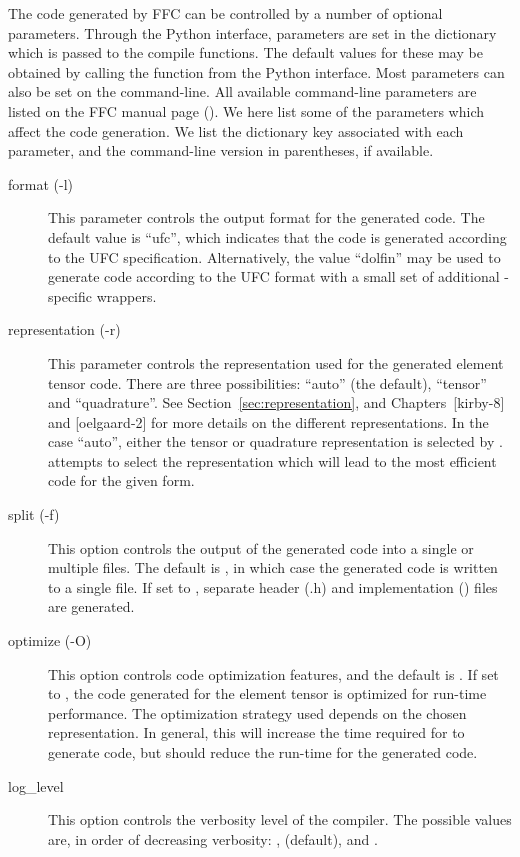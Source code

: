 The code generated by FFC can be controlled by a number of optional
parameters. Through the Python interface, parameters are set in the
dictionary  which is passed to the compile functions.
The default values for these may be obtained by calling the
function  from the Python interface. Most
parameters can also be set on the command-line.  All available
command-line parameters are listed on the FFC manual page (). We here list some of the parameters which affect the code
generation. We list the dictionary key associated with each parameter,
and the command-line version in parentheses, if available.
%
\begin{description}
  \item[format (-l)] This parameter controls the output format for the
    generated code. The default value is ``ufc'', which indicates that
    the code is generated according to the UFC
    specification. Alternatively, the value ``dolfin'' may be used to
    generate code according to the UFC format with a small set of
    additional \dolfin{}-specific wrappers.
  \item[representation (-r)] This parameter controls the
    representation used for the generated element tensor code. There
    are three possibilities: ``auto'' (the default), ``tensor'' and
    ``quadrature''. See Section~\ref{sec:representation}, and
    Chapters~[kirby-8] and [oelgaard-2] for more details on the
    different representations. In the case ``auto'', either the tensor or
    quadrature representation is selected by \ffc{}. \ffc{}
    attempts to select the representation which will lead to the
    most efficient code for the given form.
  \item[split (-f)] This option controls the output of the
    generated code into a single or multiple files. The default is
    , in which case the generated code is written to a single
    file. If set to , separate header (.h) and implementation
    () files are generated.
  \item[optimize (-O)] This option controls code optimization features,
    and the default is . If set to , the code
    generated for the element tensor is optimized for run-time performance.
    The optimization strategy used depends on
    the chosen representation. In general, this will increase the
    time required for \ffc{} to generate code, but should reduce the run-time
    for the generated code.
  \item[log\_level] This option controls the verbosity level of the
    compiler. The possible values are, in order of decreasing
    verbosity: ,  (default),  and .
\end{description}

